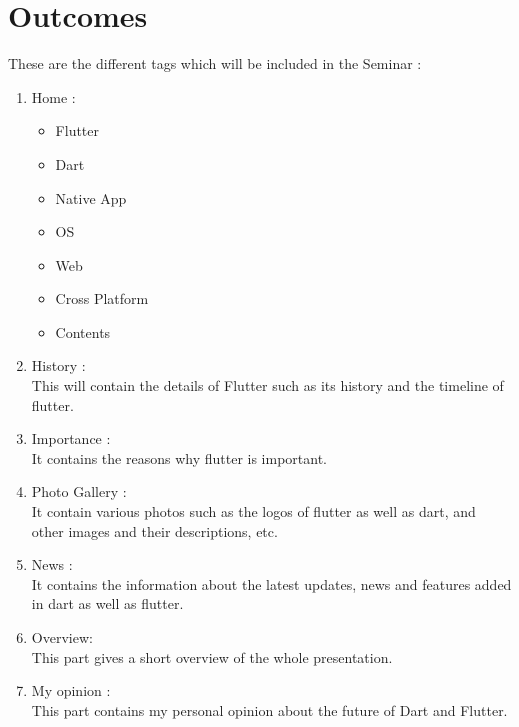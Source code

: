 \documentclass[11pt,a4paper,oneside,openright]{report}
\begin{document}
{{\section{Outcomes}
\hspace{0.2in} These are the different tags which will be included in the Seminar :
\begin{enumerate}
\item Home :
\begin{itemize}
\item Flutter
\item Dart
\item Native App
\item OS
\item Web
\item Cross Platform
\item Contents
\end{itemize}

\item History :  \\
This will contain the details of Flutter such as its history and the timeline of flutter.

\item Importance :\\
\hspace{0.2in}It contains the reasons why flutter is important.

\item Photo Gallery :\\
\hspace{0.2in}It contain various photos such as the logos of flutter as well as dart, and other images and their descriptions, etc.


\item News :\\
\hspace{0.2in}It contains the information about the latest updates, news and features added in dart as well as flutter.

\item Overview:\\
\hspace{0.2in} This part gives a short overview of the whole presentation.

\item My opinion :\\
\hspace{0.2in} This part contains my personal opinion about the future of Dart and Flutter.

\end{enumerate}





}}
\end{document}
